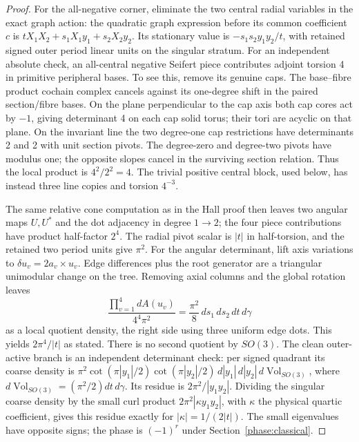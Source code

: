 \begin{proof}
For the all-negative corner, eliminate the two central
radial variables in the exact graph action:
the quadratic graph expression before its common coefficient
\(c\) is \(tX_1X_2+s_1X_1y_1+s_2X_2y_2\).
Its stationary value is \(-s_1s_2y_1y_2/t\), with retained
signed outer period linear units on the singular stratum.
For an independent absolute check, an all-central negative
Seifert piece contributes adjoint torsion 4 in primitive
peripheral bases. To see this, remove its genuine caps.
The base--fibre product cochain complex cancels against its
one-degree shift in the paired section/fibre bases. On the
plane perpendicular to the cap axis both cap cores act by
\(-1\), giving determinant 4 on each cap solid torus; their
tori are acyclic on that plane. On the invariant line the
two degree-one cap restrictions have determinants 2 and
2 with unit section pivots. The degree-zero and degree-two
pivots have modulus one; the opposite slopes cancel in
the surviving section relation. Thus the local product is
\(4^2/2^2=4\). The trivial positive central block, used
below, has instead three line copies and torsion \(4^{-3}\).

The same relative cone computation as in the Hall proof
then leaves two angular maps \(U,U^*\) and the dot
adjacency in degree \(1\to2\); the four piece contributions
have product half-factor \(2^4\). The radial pivot scalar
is \(|t|\) in half-torsion, and the retained two period
units give \(\pi^2\). For the angular determinant, lift
axis variations to \(\delta u_v=2a_v\times u_v\). Edge
differences plus the root generator are a triangular
unimodular change on the tree. Removing axial columns
and the global rotation leaves
\[
  \frac{\prod_{v=1}^4 dA(u_v)}{4^4\pi^2}
       =\frac{\pi^2}{8}\,ds_1\,ds_2\,dt\,d\gamma
\]
as a local quotient density, the right side using three
uniform edge dots. This yields \(2\pi^4/|t|\) as stated.
There is no second quotient by \(SO(3)\).
The clean outer-active branch is an independent
determinant check: per signed quadrant its coarse
density is
\(\pi^2\cot(\pi |y_1|/2)\cot(\pi |y_2|/2)
\,d|y_1|\,d|y_2|\,d\operatorname{Vol}_{SO(3)}\),
where \(d\operatorname{Vol}_{SO(3)}=(\pi^2/2)dt\,d\gamma\).
Its residue is \(2\pi^2/|y_1y_2|\). Dividing the singular
coarse density by the small curl product
\(2\pi^2|\kappa y_1y_2|\), with \(\kappa\) the physical
quartic coefficient, gives this residue exactly for
\(|\kappa|=1/(2|t|)\). The small eigenvalues have opposite
signs; the phase is \((-1)^r\) under
Section~\ref{phase:classical}.


\end{proof}

